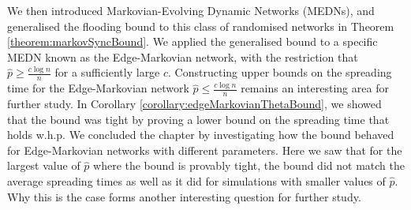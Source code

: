 We then introduced Markovian-Evolving Dynamic Networks (MEDNs), and generalised the flooding bound to this class of randomised networks in Theorem \ref{theorem:markovSyncBound}. We applied the generalised bound to a specific MEDN known as the Edge-Markovian network, with the restriction that $\hat{p} \geq \frac{c\log n}{n}$ for a sufficiently large $c$. Constructing upper bounds on the spreading time for the Edge-Markovian network $\hat{p} \leq \frac{c \log n}{n}$ remains an interesting area for further study. In Corollary \ref{corollary:edgeMarkovianThetaBound}, we showed that the bound was tight by proving a lower bound on the spreading time that holds w.h.p. We concluded the chapter by investigating how the bound behaved for Edge-Markovian networks with different parameters. Here we saw that for the largest value of $\hat{p}$ where the bound is provably tight, the bound did not match the average spreading times as well as it did for simulations with smaller values of $\hat{p}$. Why this is the case forms another interesting question for further study.

